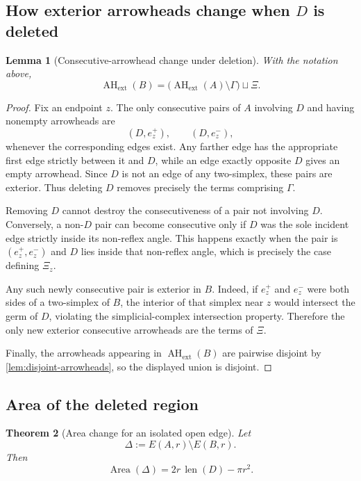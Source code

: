 \documentclass[11pt]{article}
\newtheorem{theorem}{Theorem}[section]
\newtheorem{lemma}[theorem]{Lemma}
\newcommand{\Area}{\operatorname{Area}}
\newcommand{\len}{\operatorname{len}}
\newcommand{\AHext}{\operatorname{AH}_{\mathrm{ext}}}
\numberwithin{equation}{section}
\begin{document}
\subsection{How exterior arrowheads change when \texorpdfstring{$D$}{D} is deleted}

\begin{lemma}[Consecutive-arrowhead change under deletion]\label{lem:arrowhead-change}
With the notation above,
\[
\boxed{
\AHext(B)
=
\bigl(\AHext(A)\setminus\Gamma\bigr)\sqcup\Xi.
}
\]
\end{lemma}

\begin{proof}
Fix an endpoint $z$. The only consecutive pairs of $A$ involving $D$ and having nonempty arrowheads are
\[
(D,e_z^+),
\qquad
(D,e_z^-),
\]
whenever the corresponding edges exist. Any farther edge has the appropriate first edge strictly between it and $D$, while an edge exactly opposite $D$ gives an empty arrowhead. Since $D$ is not an edge of any two-simplex, these pairs are exterior. Thus deleting $D$ removes precisely the terms comprising $\Gamma$.

Removing $D$ cannot destroy the consecutiveness of a pair not involving $D$. Conversely, a non-$D$ pair can become consecutive only if $D$ was the sole incident edge strictly inside its non-reflex angle. This happens exactly when the pair is $(e_z^+,e_z^-)$ and $D$ lies inside that non-reflex angle, which is precisely the case defining $\Xi_z$.

Any such newly consecutive pair is exterior in $B$. Indeed, if $e_z^+$ and $e_z^-$ were both sides of a two-simplex of $B$, the interior of that simplex near $z$ would intersect the germ of $D$, violating the simplicial-complex intersection property. Therefore the only new exterior consecutive arrowheads are the terms of $\Xi$.

Finally, the arrowheads appearing in $\AHext(B)$ are pairwise disjoint by \cref{lem:disjoint-arrowheads}, so the displayed union is disjoint.
\end{proof}

\subsection{Area of the deleted region}

\begin{theorem}[Area change for an isolated open edge]\label{thm:segment-delta}
Let
\[
\Delta:=E(A,r)\setminus E(B,r).
\]
Then
\[
\boxed{
\Area(\Delta)=2r\,\len(D)-\pi r^2.
}
\]
\end{theorem}
\end{document}
